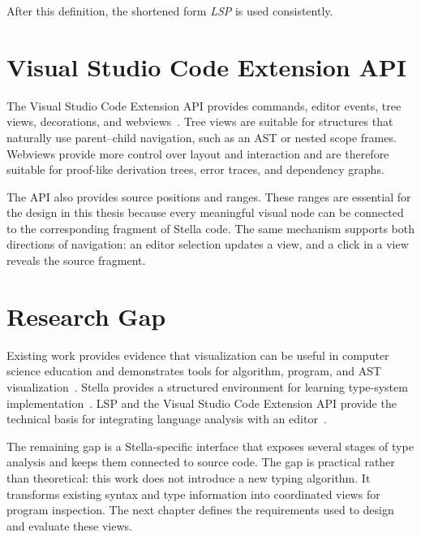 After this definition, the shortened form \emph{LSP} is used consistently.

\section{Visual Studio Code Extension API}

The Visual Studio Code Extension API provides commands, editor events, tree views, decorations, and webviews~\cite{MicrosoftVS,VSCodeTreeView,VSCodeWebview}. Tree views are suitable for structures that naturally use parent--child navigation, such as an AST or nested scope frames. Webviews provide more control over layout and interaction and are therefore suitable for proof-like derivation trees, error traces, and dependency graphs.

The API also provides source positions and ranges. These ranges are essential for the design in this thesis because every meaningful visual node can be connected to the corresponding fragment of Stella code. The same mechanism supports both directions of navigation: an editor selection updates a view, and a click in a view reveals the source fragment.

\section{Research Gap}

Existing work provides evidence that visualization can be useful in computer science education and demonstrates tools for algorithm, program, and AST visualization~\cite{Hundhausen2002MetaStudy,Naps2002Engagement,EducationalTechnologyResearch,Jeliot3,VisAST}. Stella provides a structured environment for learning type-system implementation~\cite{Abounegm2024Stella}. LSP and the Visual Studio Code Extension API provide the technical basis for integrating language analysis with an editor~\cite{MicrosoftLSP,MicrosoftVS}.

The remaining gap is a Stella-specific interface that exposes several stages of type analysis and keeps them connected to source code. The gap is practical rather than theoretical: this work does not introduce a new typing algorithm. It transforms existing syntax and type information into coordinated views for program inspection. The next chapter defines the requirements used to design and evaluate these views.


